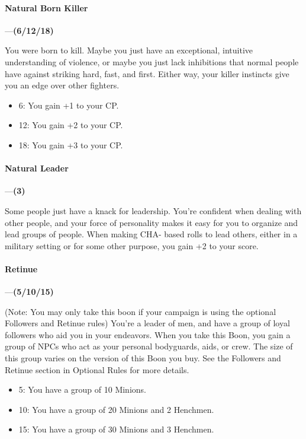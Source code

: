 \documentclass[oneside,11pt,english]{book}
\begin{document}
\paragraph{\label{boon:Natural Born Killer}Natural Born Killer}---\quad\textbf{(6/12/18) }\par
You were born to kill. Maybe you just have an exceptional, intuitive understanding of violence, or maybe 
you just lack inhibitions that normal people have against striking hard, fast, and first. Either way, your 
killer instincts give you an edge over other fighters. 

 
\begin{itemize}
\item 6: You gain +1 to your CP. 
\item 12: You gain +2 to your CP. 
\item 18: You gain +3 to your CP. 
\end{itemize}
\paragraph{\label{boon:Natural Leader}Natural Leader}---\quad\textbf{(3) }\par
Some people just have a knack for leadership. You're confident when dealing with other people, and your 
force of personality makes it easy for you to organize and lead groups of people. When making CHA-
based rolls to lead others, either in a military setting or for some other purpose, you gain +2 to your score. 
\paragraph{\label{boon:Retinue}Retinue}---\quad\textbf{(5/10/15) }\par
(Note: You may only take this boon if your campaign is using the optional Followers and Retinue rules) 
You're a leader of men, and have a group of loyal followers who aid you in your endeavors. When you 
take this Boon, you gain a group of NPCs who act as your personal bodyguards, aids, or crew. The size of 
this group varies on the version of this Boon you buy. See the Followers and Retinue section in 
Optional Rules for more details. 
\begin{itemize}
\item 5: You have a group of 10 Minions. 
\item 10: You have a group of 20 Minions and 2 Henchmen. 
\item 15: You have a group of 30 Minions and 3 Henchmen. 
\end{itemize}
\end{document}
